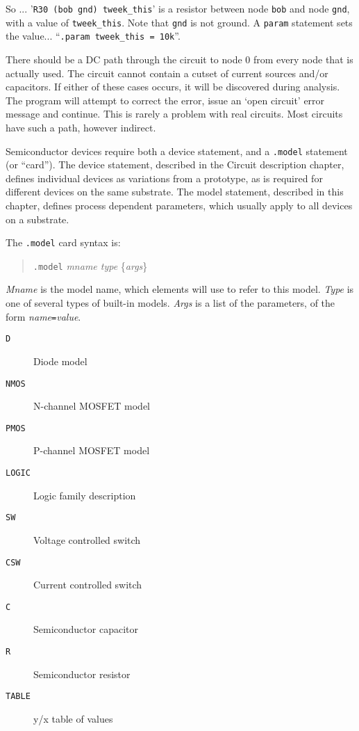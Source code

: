 So ...  '{\tt R30 (bob gnd) tweek\_this}' is a resistor between node
{\tt bob} and node {\tt gnd}, with a value of {\tt tweek\_this}.  Note
that {\tt gnd} is not ground.  A {\tt param} statement sets the
value...  ``{\tt .param tweek\_this = 10k}''.

There should be a DC path through the circuit to node 0 from every node
that is actually used.  The circuit cannot contain a cutset of current
sources and/or capacitors.  If either of these cases occurs, it will be
discovered during analysis.  The program will attempt to correct the error,
issue an `open circuit' error message and continue.  This is rarely a
problem with real circuits.  Most circuits have such a path, however
indirect.

Semiconductor devices require both a device statement, and a {\tt .model}
statement (or ``card'').  The device statement, described in the Circuit
description chapter, defines individual devices as variations from a
prototype, as is required for different devices on the same substrate.  The
model statement, described in this chapter, defines process dependent
parameters, which usually apply to all devices on a substrate.

The {\tt .model} card syntax is:
\begin{verse}
{\tt .model} {\it mname type} \{{\it args}\}
\end{verse}

{\it Mname} is the model name, which elements will use to refer to this
model.  {\it Type} is one of several types of built-in models.  {\it Args}
is a list of the parameters, of the form {\it name}{\tt =}{\it value}.

\begin{description}

\item[{\tt D}] Diode model

\item[{\tt NMOS}] N-channel MOSFET model

\item[{\tt PMOS}] P-channel MOSFET model

\item[{\tt LOGIC}] Logic family description

\item[{\tt SW}] Voltage controlled switch

\item[{\tt CSW}] Current controlled switch

\item[{\tt C}] Semiconductor capacitor

\item[{\tt R}] Semiconductor resistor

\item[{\tt TABLE}] y/x table of values

\end{description}
